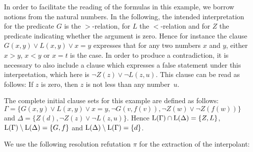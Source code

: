 \begin{exa}
	\label{exa:two_phase}
	In order to facilitate the reading of the formulas in this example, we borrow notions from the natural numbers.
	In the following, 
	the intended interpretation for the predicate $G$ is the $>$-relation, for $L$ the $<$-relation and for $Z$ the predicate indicating whether the argument is zero.
	Hence for instance the clause $G(x, y) \lor L(x, y) \lor x = y$ expresses that for any two numbers $x$ and $y$, either $x>y$, $x<y$ or $x=t$ is the case.
	In order to produce a contradiction, it is necessary to also include a clause which expresses a false statement under this interpretation, which here is $\lnot Z(z) \lor \lnot L(z, u)$. 
	This clause can be read as follows: If $z$ is zero, then $z$ is not less than any number~$u$.

	The complete initial clause sets for this example are defined as follows:
	$\Gamma = \{ G(x, y) \lor L(x, y) \lor x = y, \lnot G(v, f(v)), \lnot Z(w) \lor \lnot Z(f(w)) \}$
	and 
	$\Delta = \{ Z(d), \lnot Z(z) \lor \lnot L(z, u) \}$.
	Hence $\operatorname{L}(\Gamma)\cap \operatorname{L}(\Delta) = \{ Z, L \}$,
	$\operatorname{L}(\Gamma)\setminus \operatorname{L}(\Delta) = \{ G,  f \}$ and
	$\operatorname{L}(\Delta)\setminus \operatorname{L}(\Gamma) = \{ d \}$.

	We use the following resolution refutation $\pi$ for the extraction of the interpolant:
	\smallskip
	{ %

		
		\begin{adjustwidth}{6.2em}{0em}
			\def\defaultHypSeparation{\hskip 1.4em}
			\def\ScoreOverhang{-0em}
			\begin{prooftree}



				\RightLabelm{\resrule{\resrulefac}{\id}}


				\insertBetweenHyps{\hskip -9em}



\end{prooftree}
\end{adjustwidth}}
\end{exa}
